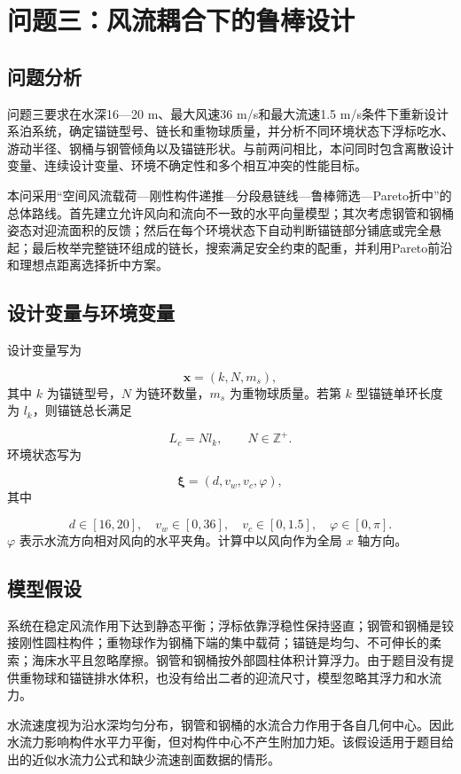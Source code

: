 \section{问题三：风流耦合下的鲁棒设计}
\subsection{问题分析}
问题三要求在水深16—20 m、最大风速36 m/s和最大流速1.5 m/s条件下重新设计系泊系统，确定锚链型号、链长和重物球质量，并分析不同环境状态下浮标吃水、游动半径、钢桶与钢管倾角以及锚链形状。与前两问相比，本问同时包含离散设计变量、连续设计变量、环境不确定性和多个相互冲突的性能目标。

本问采用“空间风流载荷—刚性构件递推—分段悬链线—鲁棒筛选—Pareto折中”的总体路线。首先建立允许风向和流向不一致的水平向量模型；其次考虑钢管和钢桶姿态对迎流面积的反馈；然后在每个环境状态下自动判断锚链部分铺底或完全悬起；最后枚举完整链环组成的链长，搜索满足安全约束的配重，并利用Pareto前沿和理想点距离选择折中方案。

\subsection{设计变量与环境变量}
设计变量写为

\[
\boldsymbol x=(k,N,m_s),
\]
其中 \(k\) 为锚链型号，\(N\) 为链环数量，\(m_s\) 为重物球质量。若第 \(k\) 型锚链单环长度为 \(l_k\)，则锚链总长满足

\[
L_c=Nl_k,\qquad N\in\mathbb Z^+.
\]
环境状态写为

\[
\boldsymbol\xi=(d,v_w,v_c,\varphi),
\]
其中

\[
d\in[16,20],\quad
v_w\in[0,36],\quad
v_c\in[0,1.5],\quad
\varphi\in[0,\pi].
\]
\(\varphi\) 表示水流方向相对风向的水平夹角。计算中以风向作为全局 \(x\) 轴方向。

\subsection{模型假设}
系统在稳定风流作用下达到静态平衡；浮标依靠浮稳性保持竖直；钢管和钢桶是铰接刚性圆柱构件；重物球作为钢桶下端的集中载荷；锚链是均匀、不可伸长的柔索；海床水平且忽略摩擦。钢管和钢桶按外部圆柱体积计算浮力。由于题目没有提供重物球和锚链排水体积，也没有给出二者的迎流尺寸，模型忽略其浮力和水流力。

水流速度视为沿水深均匀分布，钢管和钢桶的水流合力作用于各自几何中心。因此水流力影响构件水平力平衡，但对构件中心不产生附加力矩。该假设适用于题目给出的近似水流力公式和缺少流速剖面数据的情形。

